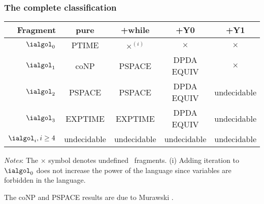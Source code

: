 \subsubsection{The complete classification}
\begin{center}
\begin{tabular}{rcccc}
Fragment  & pure & +while & +Y0 & +Y1 \\ \hline \hline
$\ialgol_0$ & PTIME & $\times^{(i)}$ & $\times$ & $\times$  \\
$\ialgol_1$ & coNP & PSPACE & DPDA EQUIV & $\times$ \\
$\ialgol_2$ & PSPACE & PSPACE & DPDA EQUIV & undecidable \\
$\ialgol_3$ &EXPTIME & EXPTIME & DPDA EQUIV & undecidable \\
$\ialgol_i, i \geq 4$  & undecidable & undecidable & undecidable
& undecidable
\end{tabular}
\vspace{12pt}

\emph{Notes}: The $\times$ symbol denotes undefined \ialgol\ fragments.
(i) Adding iteration to $\ialgol_0$ does not increase the power of the language since variables are forbidden in the language.
\end{center}

The coNP and PSPACE results are due to Murawski \citep{Mur04b}.
